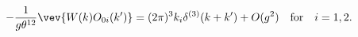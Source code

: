 \begin{equation}
  -\frac{1}{g \theta^{12}} \vev{W(k)O_{0i}(k')}
  = (2\pi)^3 k_i \delta^{(3)}(k+k') + O(g^2)
  \quad {\rm for} \quad i=1,2.
\end{equation}

